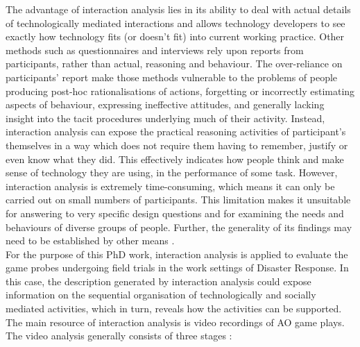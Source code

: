 The advantage of interaction analysis lies in its ability to deal with actual details of technologically mediated interactions and allows technology developers to see exactly how technology fits (or doesn't fit) into current working practice. Other methods such as questionnaires and interviews rely upon reports from participants, rather than actual, reasoning and behaviour. The over-reliance on participants' report make those methods vulnerable to the problems of people producing post-hoc rationalisations of actions, forgetting or incorrectly estimating aspects of behaviour, expressing ineffective attitudes, and generally lacking insight into the tacit procedures underlying much of their activity. Instead, interaction analysis can expose the practical reasoning activities of participant's themselves in a way which does not require them having to remember, justify or even know what they did. This effectively indicates how people think and make sense of technology they are using, in the performance of some task. However, interaction analysis is extremely time-consuming, which means it can only be carried out on small numbers of participants. This limitation makes it unsuitable for answering to very specific design questions and for examining the needs and behaviours of diverse groups of people. Further, the generality of its findings may need to be established by other means \cite{Jordan1995}.\\

For the purpose of this PhD work, interaction analysis is applied to evaluate the game probes undergoing field trials in the work settings of Disaster Response. In this case, the description generated by interaction analysis could expose information on the sequential organisation of technologically and socially mediated activities, which in turn, reveals how the activities can be supported. The main resource of interaction analysis is video recordings of \ac{AO} game plays. The video analysis generally consists of three stages \cite{Heath2010} :

